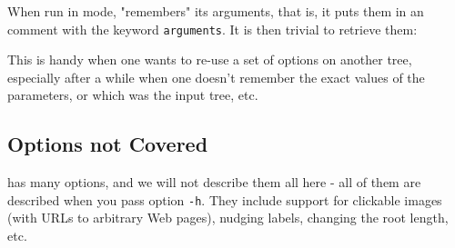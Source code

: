 When run in \svg{} mode, \display{} "remembers" its arguments, that is, it puts
them in an \xml{} comment with the keyword \texttt{arguments}. It is then
trivial to retrieve them:





\noindent{}This is handy when one wants to re-use a set of options on another
tree, especially after a while when one doesn't remember the exact values of the
parameters, or which was the input tree, etc. 

\subsection{Options not Covered}

\display{} has many options, and we will not describe them all here - all of
them are described when you pass option \texttt{-h}. They include support for
clickable images (with URLs to arbitrary Web pages), nudging labels, changing
the root length, etc. 
